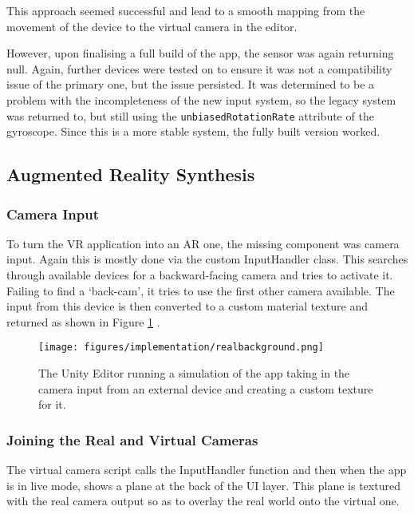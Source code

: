 \documentclass{article}
\begin{document}
This approach seemed successful and lead to a smooth mapping from the movement of the device to the virtual camera in the editor. 

However, upon finalising a full build of the app, the sensor was again returning null. Again, further devices were tested on to ensure it was not a compatibility issue of the primary one, but the issue persisted. It was determined to be a problem with the incompleteness of the new input system, so the legacy system was returned to, but still using the \verb|unbiasedRotationRate| attribute of the gyroscope. Since this is a more stable system, the fully built version worked. 

\subsection{Augmented Reality Synthesis}
\label{augmentedrealitysynthesis}

\subsubsection{Camera Input}
To turn the VR application into an AR one, the missing component was camera input. Again this is mostly done via the custom InputHandler class. This searches through available devices for a backward-facing camera and tries to activate it. Failing to find a `back-cam', it tries to use the first other camera available. The input from this device is then converted to a custom material texture and returned as shown in Figure \ref{fig:camerabackground} \cite{arsynthesis:cameratutorial}.

\begin{figure}[]
    \centering
    \texttt{[image: figures/implementation/realbackground.png]}
        \caption{The Unity Editor running a simulation of the app taking in the camera input from an external device and creating a custom texture for it.}
        \label{fig:camerabackground}
\end{figure}

\subsubsection{Joining the Real and Virtual Cameras}
The virtual camera script calls the InputHandler function and then when the app is in live mode, shows a plane at the back of the UI layer. This plane is textured with the real camera output so as to overlay the real world onto the virtual one.
\end{document}
